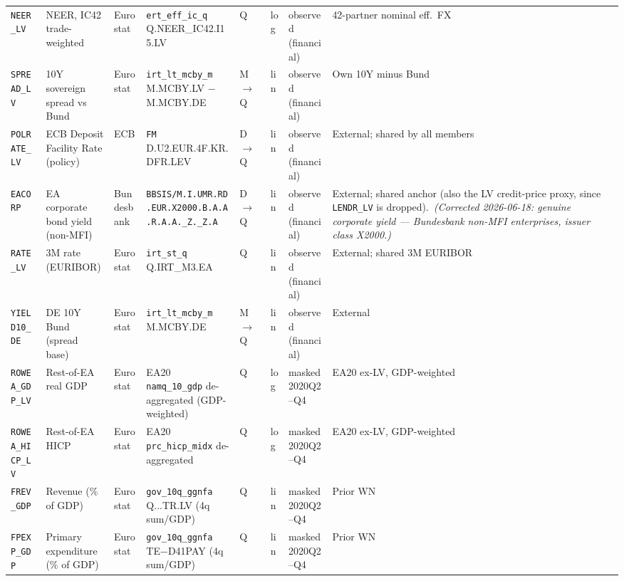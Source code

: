 {\begin{longtable}{@{}p{1.9cm}p{2.9cm}p{1.5cm}p{2.7cm}p{0.7cm}p{1.0cm}p{1.6cm}p{2.4cm}@{}}
\texttt{NEER\_LV}     & NEER, IC42 trade-weighted         & Eurostat & \texttt{ert\_eff\_ic\_q} Q.NEER\_IC42.I15.LV           & Q & log & observed (financial) & 42-partner nominal eff.\ FX \\
\texttt{SPREAD\_LV}   & 10Y sovereign spread vs Bund      & Eurostat & \texttt{irt\_lt\_mcby\_m} M.MCBY.LV $-$ M.MCBY.DE      & M$\to$Q & lin & observed (financial) & Own 10Y minus Bund \\
\texttt{POLRATE\_LV}  & ECB Deposit Facility Rate (policy) & ECB & \texttt{FM} D.\allowbreak U2.\allowbreak EUR.\allowbreak 4F.\allowbreak KR.\allowbreak DFR.\allowbreak LEV                     & D$\to$Q & lin & observed (financial) & External; shared by all members \\
\texttt{EACORP}       & EA corporate bond yield (non-MFI)  & Bundesbank & \texttt{BBSIS/\allowbreak M.\allowbreak I.\allowbreak UMR.\allowbreak RD.\allowbreak EUR.\allowbreak X2000.\allowbreak B.A.A.\allowbreak R.A.A.\allowbreak \_Z.\_Z.A}       & D$\to$Q & lin & observed (financial) & External; shared anchor (also the LV credit-price proxy, since \texttt{LENDR\_LV} is dropped).\ \textit{(Corrected 2026-06-18: genuine corporate yield --- Bundesbank non-MFI enterprises, issuer class X2000.)} \\
\texttt{RATE\_LV}     & 3M rate (EURIBOR)                 & Eurostat & \texttt{irt\_st\_q} Q.IRT\_M3.EA                       & Q & lin & observed (financial) & External; shared 3M EURIBOR \\
\texttt{YIELD10\_DE}  & DE 10Y Bund (spread base)         & Eurostat & \texttt{irt\_lt\_mcby\_m} M.MCBY.DE                    & M$\to$Q & lin & observed (financial) & External \\
\texttt{ROWEA\_GDP\_LV} & Rest-of-EA real GDP             & Eurostat & EA20 \texttt{namq\_10\_gdp} de-aggregated (GDP-weighted) & Q & log & masked 2020Q2--Q4 & EA20 ex-LV, GDP-weighted \\
\texttt{ROWEA\_HICP\_LV} & Rest-of-EA HICP               & Eurostat & EA20 \texttt{prc\_hicp\_midx} de-aggregated            & Q & log & masked 2020Q2--Q4 & EA20 ex-LV, GDP-weighted \\
\texttt{FREV\_GDP}    & Revenue (\% of GDP)               & Eurostat & \texttt{gov\_10q\_ggnfa} Q...TR.LV (4q sum/GDP)        & Q & lin & masked 2020Q2--Q4 & Prior WN \\
\texttt{FPEXP\_GDP}   & Primary expenditure (\% of GDP)   & Eurostat & \texttt{gov\_10q\_ggnfa} TE$-$D41PAY (4q sum/GDP)      & Q & lin & masked 2020Q2--Q4 & Prior WN \\

\end{longtable}}
